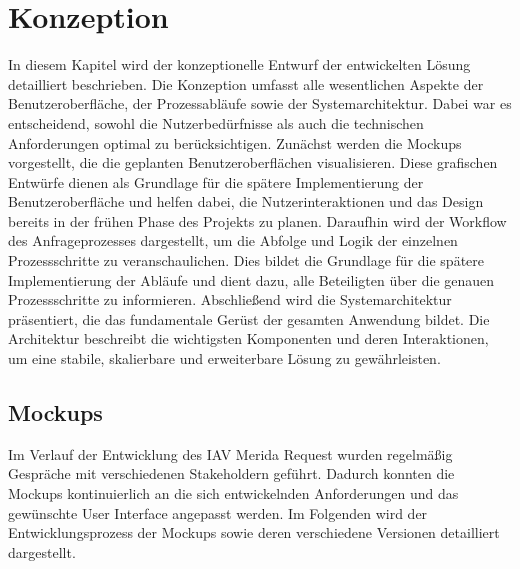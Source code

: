 \chapter{Konzeption}
In diesem Kapitel wird der konzeptionelle Entwurf der entwickelten Lösung detailliert beschrieben. Die Konzeption umfasst alle wesentlichen Aspekte der Benutzeroberfläche, der Prozessabläufe sowie der Systemarchitektur. Dabei war es entscheidend, sowohl die Nutzerbedürfnisse als auch die technischen Anforderungen optimal zu berücksichtigen.
\newline
Zunächst werden die Mockups vorgestellt, die die geplanten Benutzeroberflächen visualisieren. Diese grafischen Entwürfe dienen als Grundlage für die spätere Implementierung der Benutzeroberfläche und helfen dabei, die Nutzerinteraktionen und das Design bereits in der frühen Phase des Projekts zu planen.
\newline
Daraufhin wird der Workflow des Anfrageprozesses dargestellt, um die Abfolge und Logik der einzelnen Prozessschritte zu veranschaulichen. Dies bildet die Grundlage für die spätere Implementierung der Abläufe und dient dazu, alle Beteiligten über die genauen Prozessschritte zu informieren.
\newline
Abschließend wird die Systemarchitektur präsentiert, die das fundamentale Gerüst der gesamten Anwendung bildet. Die Architektur beschreibt die wichtigsten Komponenten und deren Interaktionen, um eine stabile, skalierbare und erweiterbare Lösung zu gewährleisten.
\newpage
\section{Mockups}
Im Verlauf der Entwicklung des IAV Merida Request wurden regelmäßig Gespräche mit verschiedenen Stakeholdern geführt. Dadurch konnten die Mockups kontinuierlich an die sich entwickelnden Anforderungen und das gewünschte User Interface angepasst werden. Im Folgenden wird der Entwicklungsprozess der Mockups sowie deren verschiedene Versionen detailliert dargestellt.
